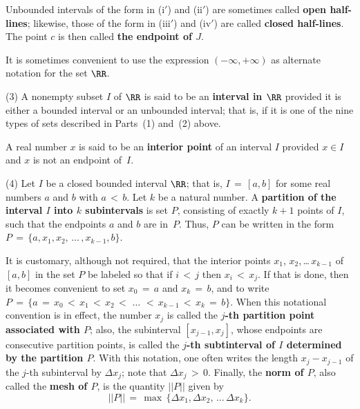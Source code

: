 \VA

\noindent Unbounded intervals of the form in (i$'$) and (ii$'$) are sometimes called {\bf open half-lines};
    likewise, those of the form in (iii$'$) and (iv$'$) are called {\bf closed half-lines}.
    The point $c$ is then called {\bf the endpoint of $J$}.

        It is sometimes convenient to use the expression $(-{\infty},+{\infty})$ as alternate notation for the set ${\RR}$.

\V

        (3) A nonempty subset $I$ of ${\RR}$ is said to be an {\bf interval in ${\RR}$} provided it is either a bounded interval or an unbounded interval;
    that is, if it is one of the nine types of sets described in Parts~(1) and~(2) above.

        A real number $x$ is said to be an {\bf interior point} of an interval $I$ provided $x{\in}I$ and $x$ is not an endpoint of~$I$.

\V

        (4) Let $I$ be a closed bounded interval ${\RR}$; that is, $I \,=\, [a,b]$ for some real numbers $a$ and $b$ with $a\,<\,b$.
    Let $k$ be a natural number.
    A {\bf partition of the interval $I$ into $k$ subintervals} is set $P$, consisting of exactly $k+1$ points of $I$, such that the endpoints $a$ and $b$ are in~$P$.
    Thus, $P$ can be written in the form $P \,=\, \{a, x_{1}, x_{2}, \,{\ldots}\,,x_{k-1},b\}$.

        It is customary, although not required, that the interior points $x_{1}$, $x_{2}$,\,{\ldots}\,$x_{k-1}$ of $[a,b]$ in the set $P$ be labeled so that if $i\,<\,j$ then $x_{i}\,<\,x_{j}$.
    If that is done, then it becomes convenient to set $x_{0} \,=\, a$ and $x_{k} \,=\, b$, and to write $P \,=\, \{a \,=\, x_{0}\,<\,x_{1}\,<\,x_{2}\,<\,\,{\ldots}\,\,<\,x_{k-1}\,<\,x_{k} \,=\, b\}$.
    When this notational convention is in effect, the number $x_{j}$ is called the {\bf $j$-th partition point associated with $P$}; also, the subinterval $[x_{j-1},x_{j}]$, whose endpoints are consecutive partition points, is called the {\bf $j$-th subtinterval of $I$ determined by the partition $P$}.
    With this notation, one often writes the length $x_{j}-x_{j-1}$ of the $j$-th subinterval by ${\Delta}x_{j}$; note that ${\Delta}x_{j}\,>\,0$.
    Finally, the {\bf norm of $P$},
    also called the {\bf mesh of $P$}, is the quantity $||P||$ given by
        \begin{displaymath}
        ||P|| \,=\, {\max}\,\{{\Delta}x_{1},{\Delta}x_{2},\,{\ldots}\,{\Delta}x_{k}\}.
        \end{displaymath}


